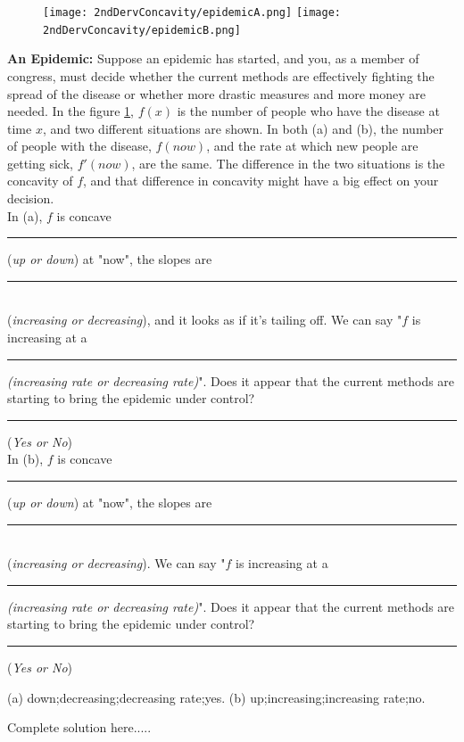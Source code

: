\begin{figure}
\vspace{-.5cm}
\texttt{[image: 2ndDervConcavity/epidemicA.png]}
\texttt{[image: 2ndDervConcavity/epidemicB.png]}
\caption{ }
\label{fig:epidemic}
\end{figure}

\hfill \break
\vspace{-1.25cm}
\begin{example}{\label{epidemic}}
\textbf{An Epidemic:} Suppose an epidemic has started, and you, as a member of congress, must decide whether the current methods are effectively fighting the spread of the disease or whether more drastic measures and more money are needed. In the figure \ref{fig:epidemic}, $f(x)$ is the number of people who have the disease at time $x$, and two different situations are shown. In both (a) and (b), the number of people with the disease, $f(now)$, and the rate at which new people are getting sick, $f '(now)$, are the same. The difference in the two situations is the concavity of $f$, and that difference in concavity might have a big effect on your decision.\\

\noindent In (a), $f$ is concave \rule{2cm}{0.25mm}(\emph{up or down}) at "now", the slopes are \rule{4cm}{0.25mm}\\(\emph{increasing or decreasing}), and it looks as if it’s tailing off. We can say "$f$ is increasing at a \rule{2cm}{0.25mm}\emph{(increasing rate or decreasing rate)}". Does it appear that the current methods are starting to bring the epidemic under control? \rule{2cm}{0.25mm}(\emph{Yes or No})\\
\hfill \break
\noiindent In (b), $f$ is concave \rule{2cm}{0.25mm}(\emph{up or down}) at "now", the slopes are \rule{4cm}{0.25mm}\\(\emph{increasing or decreasing}). We can say "$f$ is increasing at a \rule{2cm}{0.25mm}\emph{(increasing rate or decreasing rate)}". Does it appear that the current methods are starting to bring the epidemic under control? \rule{2cm}{0.25mm}(\emph{Yes or No})
    \begin{sol}
    (a) down;decreasing;decreasing rate;yes. (b) up;increasing;increasing rate;no.
    \end{sol}
    \begin{solL}
    Complete solution here.....
    
    \end{solL}
    
\end{example}
\vspace{0.6in}
